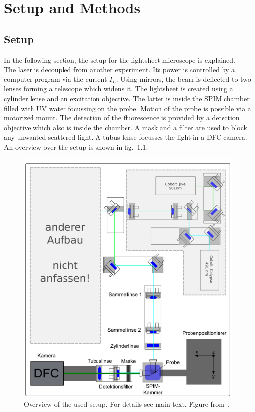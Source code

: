 

\def\skalierung{0.65}

\chapter{Setup and Methods}
\label{chap:methods}
\section{Setup}\label{sec:setup}
In the following section, the setup for the lightsheet microscope is explained. \\
The laser is decoupled from another experiment. Its power is controlled by a computer program via the current $I_L$. Using mirrors, the beam is deflected to two lenses forming a telescope which widens it. The lightsheet is created using a cylinder lense and an excitation objective. The latter is inside the SPIM chamber filled with UV water focussing on the probe. Motion of the probe is possible via a motorized mount. The detection of the fluorescence is provided by a detection objective which also is inside the chamber. A mask and a filter are used to block any unwanted scattered light. A tubus lense focusses the light in a DFC camera. An overview over the setup is shown in fig.~\ref{fig:setup}.

\begin{figure}[ht]
    \centering
    \includegraphics[width = \textwidth]{Bilder/Setup/setup.png}
    \caption{Overview of the used setup. For details see main text. Figure from~\cite{Struntz.2017}.}
    \label{fig:setup}
\end{figure}



